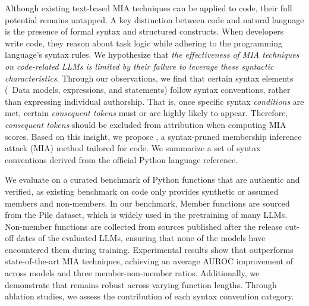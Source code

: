 
Although existing text-based MIA techniques can be applied to code, their full potential remains untapped. A key distinction between code and natural language is the presence of formal syntax and structured constructs. When developers write code, they reason about task logic while adhering to the programming language's syntax rules. We hypothesize that \textit{the effectiveness of MIA techniques on code-related LLMs is limited by their failure to leverage these syntactic characteristics}. Through our observations, we find that certain syntax elements (\eg~Data models, expressions, and statements) follow syntax conventions, rather than expressing individual authorship. That is, once specific syntax \textit{conditions} are met, certain \textit{consequent tokens} must or are highly likely to appear. Therefore, \textit{consequent tokens} should be excluded from attribution when computing MIA scores. Based on this insight, we propose \tool, a syntax-pruned membership inference attack (MIA) method tailored for code. We summarize a set of  syntax conventions derived from the official Python language reference.

We evaluate \tool on a curated benchmark of Python functions that are authentic and verified, as existing benchmark on code only provides synthetic or assumed members and non-members. In our benchmark, Member functions are sourced from the Pile dataset, which is widely used in the pretraining of many LLMs. Non-member functions are collected from sources published after the release cut-off dates of the evaluated LLMs, ensuring that none of the models have encountered them during training. 
Experimental results show that \tool outperforms state-of-the-art MIA techniques, achieving an average AUROC improvement of  across  models and three member-non-member ratios. Additionally, we demonstrate that \tool remains robust across varying function lengths. Through ablation studies, we assess the contribution of each syntax convention category. %

